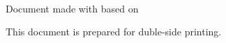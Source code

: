\begin{large}

\begin{center}
  \textbf{\authors}%


  \leavevmode \\\relax \mbox{ }%
  \secondSubtitle \leavevmode \\[0.3em]
  \leavevmode \\\relax \mbox{ }%

  \textbf{\institution}\leavevmode \\[1em]
  \textbf{\publicationdate}

\end{center}

\end{large}

\vfill %


\restoregeometry


\newpage

\thispagestyle{empty} \mbox{ } \vfill%
\begin{small}
  \begin{center}
    Document made with \viktex \viktexver based on \texis\mbox{ } 
  \end{center}
\end{small}
\vspace*{2cm}
\begin{small}
  \begin{center}
    \noindent This document is prepared for duble-side printing. 
  \end{center}
\end{small}


\newpage

\thispagestyle{empty}

\mbox{ }

\begin{Huge}
  \begin{center}
    \ltitle
  \end{center}
\end{Huge}

\vfill %

\begin{large}
  \begin{center}
    \firstSubtitle\ \leavevmode \\\relax \mbox{ } \leavevmode
    \\\relax \mbox{ } \leavevmode \\\relax
    \degreeMultilang \\\relax
    \secondSubtitle \leavevmode \\[0.3em]
  \end{center}
\end{large}


